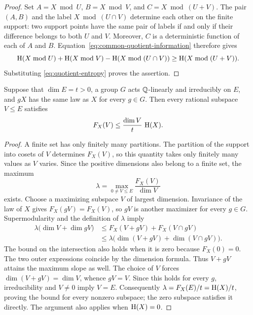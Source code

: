 \begin{proof}
Set $A=X\bmod U$, $B=X\bmod V$, and $C=X\bmod(U+V)$.
The pair $(A,B)$ and the label $X\bmod(U\cap V)$ determine each other
on the finite support: two support points have the same pair of labels
if and only if their difference belongs to both $U$ and $V$.
Moreover, $C$ is a deterministic function of each of $A$ and $B$.
Equation~\eqref{eq:common-quotient-information} therefore gives
\[
  \operatorname{H}(X\bmod U)+\operatorname{H}(X\bmod V)
  -\operatorname{H}(X\bmod(U\cap V))
  \geq \operatorname{H}(X\bmod(U+V)).
\]
Substituting \eqref{eq:quotient-entropy} proves the assertion.
\end{proof}

\begin{lemma}
\label{lem:invariant}
Suppose that $\dim E=t>0$, a group $G$ acts $\mathbb Q$-linearly and
irreducibly on $E$, and $gX$ has the same law as $X$ for every $g\in G$.
Then every rational subspace $V\leq E$ satisfies
\begin{equation}
  F_X(V)\leq \frac{\dim V}{t}\,\operatorname{H}(X).
  \label{eq:invariant-entropy}
\end{equation}
\end{lemma}

\begin{proof}
A finite set has only finitely many partitions.  The partition of the
support into cosets of $V$ determines $F_X(V)$, so this quantity takes
only finitely many values as $V$ varies.  Since the positive dimensions
also belong to a finite set, the maximum
\[
  \lambda=\max_{0\neq V\leq E}\frac{F_X(V)}{\dim V}
\]
exists.  Choose a maximizing subspace $V$ of largest dimension.
Invariance of the law of $X$ gives $F_X(gV)=F_X(V)$, so $gV$ is another
maximizer for every $g\in G$.  Supermodularity and the definition of
$\lambda$ imply
\begin{align*}
  \lambda\bigl(\dim V+\dim gV\bigr)
  &\leq F_X(V+gV)+F_X(V\cap gV)\\
  &\leq\lambda\bigl(\dim(V+gV)+\dim(V\cap gV)\bigr).
\end{align*}
The bound on the intersection also holds when it is zero because
$F_X(0)=0$.  The two outer expressions coincide by the dimension formula.
Thus $V+gV$ attains the maximum slope as well.  The choice of $V$ forces
$\dim(V+gV)=\dim V$, whence $gV=V$.  Since this holds for every $g$,
irreducibility and $V\neq 0$ imply $V=E$.
Consequently $\lambda=F_X(E)/t=\operatorname{H}(X)/t$, proving the bound for every
nonzero subspace; the zero subspace satisfies it directly.
The argument also applies when $\operatorname{H}(X)=0$.
\end{proof}

